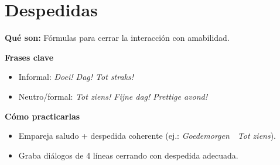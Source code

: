 \section{Despedidas}
\textbf{Qué son:} Fórmulas para cerrar la interacción con amabilidad.

\textbf{Frases clave}
\begin{itemize}[leftmargin=*]
  \item Informal: \textit{Doei! Dag! Tot straks!}
  \item Neutro/formal: \textit{Tot ziens! Fijne dag! Prettige avond!}
\end{itemize}

\textbf{Cómo practicarlas}
\begin{itemize}[leftmargin=*]
  \item Empareja saludo + despedida coherente (ej.: \textit{Goedemorgen}~\textrightarrow{}~\textit{Tot ziens}).
  \item Graba diálogos de 4 líneas cerrando con despedida adecuada.
\end{itemize}
